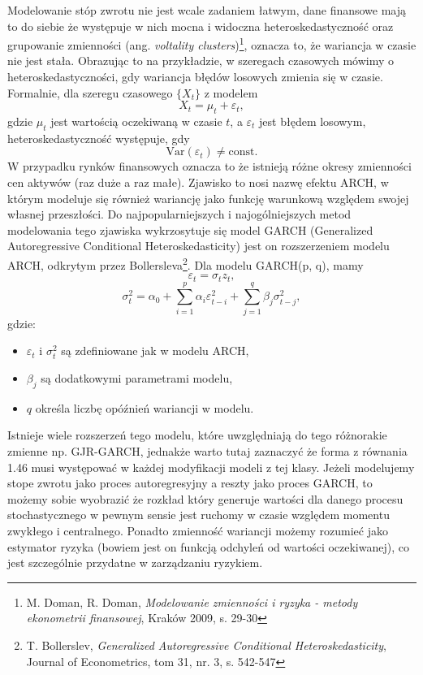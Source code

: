 \begin{enumerate}
Modelowanie stóp zwrotu nie jest wcale zadaniem łatwym, dane finansowe mają to do siebie że występuje w nich mocna i widoczna heteroskedastyczność oraz grupowanie zmienności (ang. \textit{voltality clusters})\footnote{M. Doman, R. Doman, \textit{Modelowanie zmienności i ryzyka - metody ekonometrii finansowej}, Kraków 2009, s. 29-30}, oznacza to, że wariancja w czasie nie jest stała. Obrazując to na przykładzie, w szeregach czasowych mówimy o heteroskedastyczności, gdy wariancja błędów losowych zmienia się w czasie. Formalnie, dla szeregu czasowego \( \{X_t\} \) z modelem
\begin{equation}
X_t = \mu_t + \varepsilon_t,
\end{equation}
gdzie \( \mu_t \) jest wartością oczekiwaną w czasie \( t \), a \( \varepsilon_t \) jest błędem losowym, heteroskedastyczność występuje, gdy
\begin{equation}
\text{Var}(\varepsilon_t) \neq \text{const.}
\end{equation}
W przypadku rynków finansowych oznacza to że istnieją różne okresy zmienności cen aktywów (raz duże a raz małe). Zjawisko to nosi nazwę efektu ARCH, w którym modeluje się również wariancję jako funkcję warunkową względem swojej własnej przeszłości. Do najpopularniejszych i najogólniejszych metod modelowania tego zjawiska wykrzosytuje się model GARCH (Generalized Autoregressive Conditional Heteroskedasticity) jest on rozszerzeniem modelu ARCH, odkrytym przez Bollersleva\footnote{T. Bollerslev, \textit{Generalized Autoregressive Conditional Heteroskedasticity}, Journal of Econometrics, tom 31, nr. 3, s. 542-547}. Dla modelu GARCH(p, q), mamy
\begin{equation}
\varepsilon_t = \sigma_t z_t,
\end{equation}
\begin{equation}
\sigma_t^2 = \alpha_0 + \sum_{i=1}^{p} \alpha_i \varepsilon_{t-i}^2 + \sum_{j=1}^{q} \beta_j \sigma_{t-j}^2,
\end{equation}
gdzie:
\begin{itemize}
  \item \( \varepsilon_t \) i \( \sigma_t^2 \) są zdefiniowane jak w modelu ARCH,
  \item \( \beta_j \) są dodatkowymi parametrami modelu,
  \item \( q \) określa liczbę opóźnień wariancji w modelu.
\end{itemize}
Istnieje wiele rozszerzeń tego modelu, które uwzględniają do tego różnorakie zmienne np. GJR-GARCH, jednakże warto tutaj zaznaczyć że forma z równania 1.46 musi występować w każdej modyfikacji modeli z tej klasy.   
Jeżeli modelujemy stope zwrotu jako proces autoregresyjny a reszty jako proces GARCH, to możemy sobie wyobrazić że rozkład który generuje wartości dla danego procesu stochastycznego w pewnym sensie jest ruchomy w czasie względem momentu zwykłego i centralnego. Ponadto zmienność wariancji możemy rozumieć jako estymator ryzyka (bowiem jest on funkcją odchyleń od wartości oczekiwanej), co jest szczególnie przydatne w zarządzaniu ryzykiem.


\end{enumerate}
